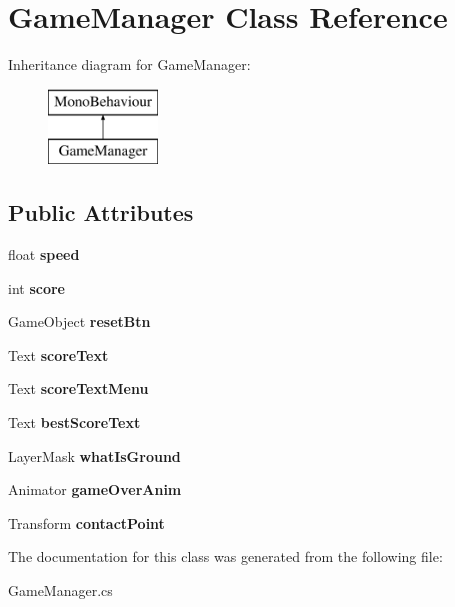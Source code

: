 \hypertarget{class_game_manager}{}\section{Game\+Manager Class Reference}
\label{class_game_manager}
Inheritance diagram for Game\+Manager\+:\begin{figure}[H]
\begin{center}
\leavevmode
\includegraphics[height=2.000000cm]{class_game_manager}
\end{center}
\end{figure}
\subsection*{Public Attributes}
\begin{DoxyCompactItemize}
\item 
\mbox{\label{class_game_manager_a7a3732d88888e672f51ba07d10dc1c2b}} 
float {\bfseries speed}
\item 
\mbox{\label{class_game_manager_ae9711122c3e5251d8f9ff4e02283af09}} 
int {\bfseries score}
\item 
\mbox{\label{class_game_manager_a571eb018f12e085310061f8d9128bd70}} 
Game\+Object {\bfseries reset\+Btn}
\item 
\mbox{\label{class_game_manager_a398d163978e15786ef9cea1be1c877d9}} 
Text {\bfseries score\+Text}
\item 
\mbox{\label{class_game_manager_aa46bc20b46271084abc755ea0cae7df0}} 
Text {\bfseries score\+Text\+Menu}
\item 
\mbox{\label{class_game_manager_a1962a62add77291ec291401b94223800}} 
Text {\bfseries best\+Score\+Text}
\item 
\mbox{\label{class_game_manager_a81293487e97b92a270eedafff9100b11}} 
Layer\+Mask {\bfseries what\+Is\+Ground}
\item 
\mbox{\label{class_game_manager_a88384641870110b5d25f42687fe373a7}} 
Animator {\bfseries game\+Over\+Anim}
\item 
\mbox{\label{class_game_manager_ae73fa16e65d6a73673a2bb11ac272631}} 
Transform {\bfseries contact\+Point}
\end{DoxyCompactItemize}


The documentation for this class was generated from the following file\+:\begin{DoxyCompactItemize}
\item 
Game\+Manager.\+cs\end{DoxyCompactItemize}
